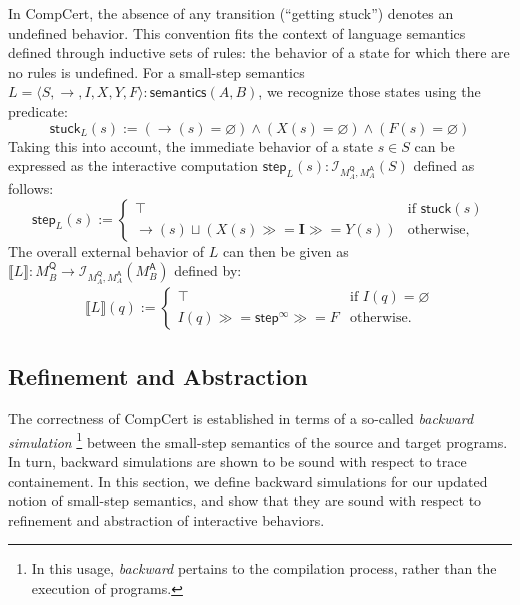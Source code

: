 \documentclass[acmsmall,timestamp,review,anonymous]{acmart}
\newcommand{\kw}[1]{\ensuremath{ \mathsf{#1} }}
\newcommand{\bind}{\gg\!\!=}
\begin{document}
In CompCert, the absence of any transition (``getting stuck'')
denotes an undefined behavior.
This convention fits the context of
language semantics defined through inductive sets of rules:
the behavior of a state for which there are no rules is undefined.
For a small-step semantics
$L = \langle S, {\rightarrow}, I, X, Y, F \rangle : \kw{semantics}(A,B)$,
we recognize those states using the predicate:
\[
    \kw{stuck}_L(s) :=
      ({\rightarrow}(s) = \varnothing) \wedge
      (X(s) = \varnothing) \wedge
      (F(s) = \varnothing)
\]
Taking this into account,
the immediate behavior of a state $s \in S$
can be expressed as the interactive computation
$\kw{step}_L(s) : \mathcal{I}_{M_A^\kw{Q},M_A^\kw{A}}(S)$
defined as follows:
\[
  \kw{step}_L(s) :=
    \begin{cases}
      \top & \mbox{if } \kw{stuck}(s) \\
      {\rightarrow}(s) \sqcup
      (X(s) \bind \mathbf{I} \bind Y(s)) & \mbox{otherwise,}
   \end{cases}
\]
The overall external behavior of $L$
can then be given as
$
    \llbracket L \rrbracket :
      M_B^\kw{Q} \rightarrow \mathcal{I}_{M_A^\kw{Q},M_A^\kw{A}}(M_B^\kw{A})
$
defined by:
\begin{align*}
  \llbracket L \rrbracket (q) :=
    \begin{cases}
       \top & \mbox{if } I(q) = \varnothing \\
       I(q) \bind \kw{step}^\infty \bind F & \mbox{otherwise.}
     \end{cases}
\end{align*}


\subsection{Refinement and Abstraction} \label{sec:modsem:sim} %
\label{sec:modsem:ref}

The correctness of CompCert is established in terms of
a so-called \emph{backward simulation}%
\footnote{In this usage, \emph{backward} pertains to
  the compilation process,
  rather than the execution of programs.}
between the small-step semantics of the source and target programs.
In turn, backward simulations
are shown to be sound with respect to trace containement.
In this section,
we define backward simulations for our updated notion
of small-step semantics,
and show that they are sound with respect to
refinement and abstraction of interactive behaviors.
\end{document}
